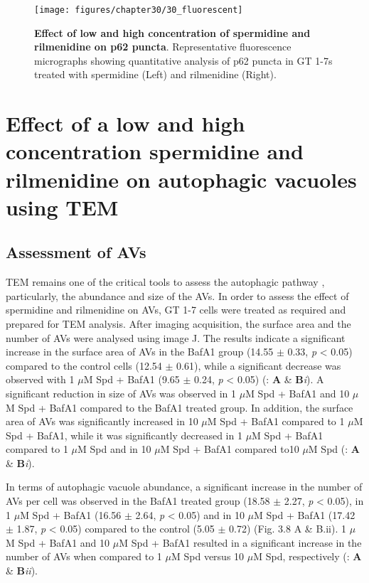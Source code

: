 {\begin{figure}[!htbp]
\center
  \texttt{[image: figures/chapter30/30\_fluorescent]}
  \caption[Effect of low and high concentration of spermidine and rilmenidine on p62 puncta - fluorescence micrographs]{\textbf{Effect of low and high concentration of spermidine and rilmenidine on p62 puncta}. Representative fluorescence micrographs showing quantitative analysis of p62 puncta in GT 1-7s treated with spermidine (Left) and rilmenidine (Right).}
  \label{fig:30_fluorescent}
\end{figure} 

\section{Effect of a low and high concentration spermidine and rilmenidine on autophagic vacuoles using TEM}
\subsection{Assessment of AVs}

TEM remains one of the critical tools to assess the autophagic pathway \citep{klionsky2016}, particularly, the abundance and size of the AVs.  In order to assess the effect of spermidine and rilmenidine on AVs, GT 1-7 cells were treated as required and prepared for TEM analysis. After imaging acquisition, the surface area and the number of AVs were analysed using image J. The results indicate a significant increase in the surface area of AVs in the BafA1 group (14.55 $\pm$ 0.33, \textit{p} < 0.05) compared to the control cells (12.54 $\pm$ 0.61), while a significant decrease was observed with 1 $\mu$M Spd + BafA1 (9.65 $\pm$ 0.24, \textit{p} < 0.05) (: \textbf{A} \& \textbf{B}\textit{i}).  A significant reduction in size of AVs was observed in 1 $\mu$M Spd + BafA1 and 10 $\mu$M Spd + BafA1 compared to the BafA1 treated group. In addition, the surface area of AVs was significantly increased in 10 $\mu$M Spd + BafA1 compared to 1 $\mu$M Spd + BafA1, while it was significantly decreased in 1 $\mu$M Spd + BafA1 compared to 1 $\mu$M Spd and in 10 $\mu$M Spd + BafA1 compared to10 $\mu$M Spd (: \textbf{A} \& \textbf{B}\textit{i}). 
 
In terms of autophagic vacuole abundance, a significant increase in the number of AVs per cell was observed in the BafA1 treated group (18.58 $\pm$ 2.27, \textit{p} < 0.05), in 1 $\mu$M Spd + BafA1 (16.56 $\pm$ 2.64, \textit{p} < 0.05) and in 10 $\mu$M Spd + BafA1 (17.42 $\pm$ 1.87, \textit{p} < 0.05) compared to the control (5.05 $\pm$ 0.72) (Fig. 3.8 A \& B.ii). 1 $\mu$M Spd + BafA1 and 10 $\mu$M Spd + BafA1 resulted in a significant increase in the number of AVs when compared to 1 $\mu$M Spd versus 10 $\mu$M Spd, respectively (: \textbf{A} \& \textbf{B}\textit{ii}).

}
